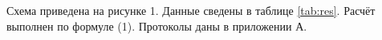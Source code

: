 Схема приведена на рисунке 1. %
Данные сведены в таблице \ref{tab:res}. %
Расчёт выполнен по формуле (1). %
Протоколы даны в приложении А. %
